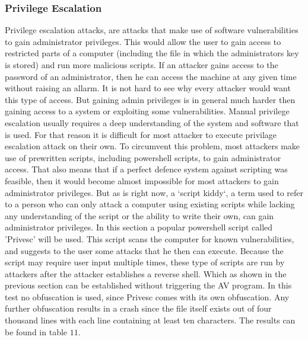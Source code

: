 \documentclass{article}%
\begin{document}
\subsubsection{Privilege Escalation}
Privilege escalation attacks, are attacks that make use of software vulnerabilities to gain administrator privileges. This would allow the user to gain access to restricted parts of a computer (including the file in which the administrators key is stored) and run more malicious scripts. If an attacker gains access to the password of an administrator, then he can access the machine at any given time without raising an allarm. It is not hard to see why every attacker would want this type of access. But gaining admin privileges is in general much harder then gaining access to a system or exploiting some vulnerabilities. Manual privilege escalation usually requires a deep understanding of the system and software that is used. For that reason it is difficult for most attacker to execute privilage escalation attack on their own. To circumvent this problem, most attackers make use of prewritten scripts, including powershell scripts, to gain administrator access. That also means that if a perfect defence system against scripting was feasible, then it would become almost impossible for most attackers to gain administrator privileges. But as is right now, a `script kiddy`, a term used to refer to a person who can only attack a computer using existing scripts while lacking any understanding of the script or the ability to write their own, can gain administrator privileges. In this section a popular powershell script called 'Privesc' will be used. This script scans the computer for known vulnerabilities, and suggests to the user some attacks that he then can execute. Because the script may require user input multiple times, these type of scripts are run by attackers after the attacker establishes a reverse shell. Which as shown in the previous section can be established without triggering the AV program. In this test no obfuscation is used, since Privesc comes with its own obfuscation. Any further obfuscation results in a crash since the file itself exists out of four thousand lines with each line containing at least ten characters. The results can be found in table $11$.
\end{document}
